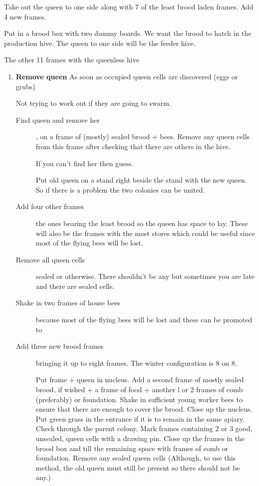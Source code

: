 Take out the queen to one side along with 7 of the least brood laden frames.  
Add 4 new frames.


Put in a brood box with two dummy boards.
We want the brood to hatch in the production hive.
The queen to one side will be the feeder hive.

The other 11 frames with the queenless hive

\begin{enumerate}

\item \textbf{Remove queen}
As soon as occupied queen cells are discovered (eggs or grubs)

Not trying to work out if they are going to swarm.

\begin{description}
  \item[Find queen and remove her], on a frame of (mostly) sealed brood + bees. Remove any queen cells from this frame after checking that there are others in the hive.

If you can't find her then guess.

Put old queen on a stand right beside the stand with the new queen.
So if there is a problem the two colonies can be united.

  \item[Add four other frames] the ones bearing the least brood so the queen has space to lay.
  These will also be the frames with the most stores which could be useful since most of the flying bees will be lost.

  \item[Remove all queen cells] sealed or otherwise.  There shouldn't be any but sometimes you are late and there are sealed cells.
 
  \item[Shake in two frames of house bees] because most of the flying bees will be lost and these can be promoted to 
 
  \item[Add three new brood frames] bringing it up to eight frames.  The winter configuration is 8 on 8.
  
  
Put frame + queen in nucleus.
Add a second frame of mostly sealed brood, if wished + a frame of food + another l or 2
frames of comb (preferably) or foundation.
Shake in sufficient young worker bees to ensure that there are enough to cover the brood.
Close up the nucleus. Put green grass in the entrance if it is to remain in the same apiary.
Check through the parent colony.  Mark frames containing 2 or 3 good, unsealed, queen cells with a drawing pin.
Close up the frames in the brood box and till the remaining space with frames of comb or foundation.
Remove any sealed queen cells (Although, to use this method, the old queen must still be present so there should not be any.)


\end{description}
\end{enumerate}
